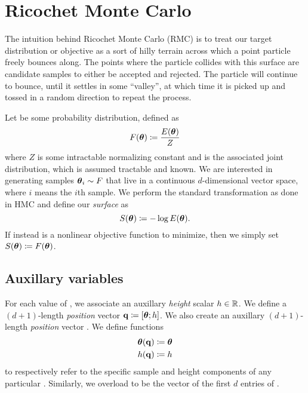 \section{Ricochet Monte Carlo} \label{s:rmc}

The intuition behind Ricochet Monte Carlo (RMC) is to treat our target
distribution or objective as a sort of hilly terrain across which a point
particle freely bounces along. The points where the particle collides with this
surface are candidate samples to either be accepted and rejected. The particle
will continue to bounce, until it settles in some ``valley'', at which time it is
picked up and tossed in a random direction to repeat the process.

Let \target{} be some probability distribution, defined as
\begin{equation*}
    F(\boldsymbol{\theta}){} \coloneqq \frac{E(\boldsymbol{\theta}){}}{Z}
\end{equation*}
where $Z$ is some intractable normalizing constant and \energy{} is the
associated joint distribution, which is assumed tractable and known. We are
interested in generating samples $\boldsymbol{\theta}_i{} \sim F$ that live in a continuous
$d$-dimensional vector space, where $i$ means the $i$th sample. We perform the
standard transformation as done in HMC and define our \emph{surface} as
\begin{equation*}
    \label{eq:surface}
    S(\boldsymbol{\theta}){} \coloneqq - \log E(\boldsymbol{\theta}){}.
\end{equation*}
If instead \target{} is a nonlinear objective function to minimize, then we
simply set $S(\boldsymbol{\theta}){} \coloneqq F(\boldsymbol{\theta}){}$.

\subsection{Auxillary variables} \label{ss:auxillary}

For each value of \thetab{}, we associate an auxillary \emph{height} scalar $h{}
\in \mathbb{R}$. We define a $(d+1)$-length \emph{position} vector $\mathbf{q}{}
\coloneqq [\boldsymbol{\theta}{}; h{}]$. We also create an auxillary $(d+1)$-length
\emph{position} vector \p{}. We define functions
\begin{align*}
    \boldsymbol{\theta}(\mathbf{q}{}) &\coloneqq  \boldsymbol{\theta}{} \\
    h(\mathbf{q}{})     &\coloneqq  h{}
\end{align*}
to respectively refer to the specific sample and height components of any
particular \q{}. Similarly, we overload \thetaof{\p{}} to be the vector of the
first $d$ entries of \p{}.

